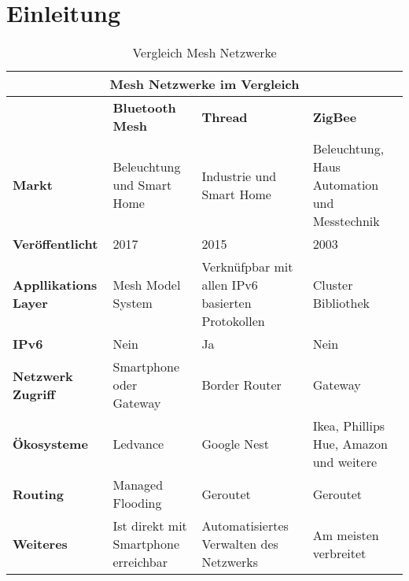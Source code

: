 \newpage
\section{Einleitung}


\begin{table}[h]
	\centering
	\begin{adjustbox}{width=1\textwidth}
	\begin{tabular}{@{}|l|l|l|l|@{}}
		\toprule
		\multicolumn{4}{|c|}{\textbf{Mesh Netzwerke im Vergleich}}                                                                                                            \\ \midrule
		& \textbf{Bluetooth Mesh}              & \textbf{Thread}                                  & \textbf{ZigBee}                              \\ \midrule
		\textbf{Markt}               & Beleuchtung und Smart Home           & Industrie und Smart Home                         & Beleuchtung, Haus Automation und Messtechnik \\ \midrule
		\textbf{Veröffentlicht}      & 2017                                 & 2015                                             & 2003                                         \\ \midrule
		\textbf{Appllikations Layer} & Mesh Model System                    & Verknüfpbar mit allen IPv6 basierten Protokollen & Cluster Bibliothek                           \\ \midrule
		\textbf{IPv6}                & Nein                                 & Ja                                               & Nein                                         \\ \midrule
		\textbf{Netzwerk Zugriff}    & Smartphone oder Gateway              & Border Router                                    & Gateway                                      \\ \midrule
		\textbf{Ökosysteme}          & Ledvance                             & Google Nest                                      & Ikea, Phillips Hue, Amazon und weitere       \\ \midrule
		\textbf{Routing}             & Managed Flooding                     & Geroutet                                         & Geroutet                                     \\ \midrule
		\textbf{Weiteres}            & Ist direkt mit Smartphone erreichbar & Automatisiertes Verwalten des Netzwerks          & Am meisten verbreitet                        \\ \bottomrule
	\end{tabular}
	\end{adjustbox}
	\caption{Vergleich Mesh Netzwerke}
	\label{table:VergleichMeshNetzwerk}
\end{table}

